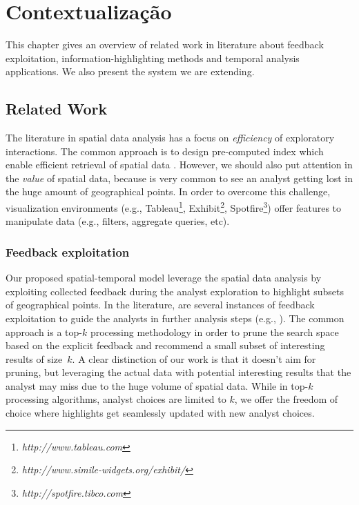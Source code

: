 \chapter{Contextualização}
\label{chap:contextualizacao}

This chapter gives an overview of related work in literature about feedback exploitation, information-highlighting methods and temporal analysis applications. We also present the system we are extending.

\section{Related Work}

The literature in spatial data analysis has a focus on {\em efficiency} of exploratory interactions. The common approach is to design pre-computed index which enable efficient retrieval of spatial data \cite{lins2013nanocubes}. However, we should also put attention in the {\em value} of spatial data, because is very common to see an analyst getting lost in the huge amount of geographical points. In order to overcome this challenge, visualization environments (e.g., Tableau\footnote{\it http://www.tableau.com}, Exhibit\footnote{\it http://www.simile-widgets.org/exhibit/}, Spotfire\footnote{\it  http://spotfire.tibco.com}) offer features to manipulate data (e.g., filters, aggregate queries, etc).

\subsection{Feedback exploitation}

Our proposed spatial-temporal model leverage the spatial data analysis by exploiting collected feedback during the analyst exploration to highlight subsets of geographical points. In the literature, are several instances of feedback exploitation to guide the analysts in further analysis steps (e.g., ).  The common approach is a top-$k$ processing methodology in order to prune the search space based on the explicit feedback and recommend a small subset of interesting results of size~$k$. A clear distinction of our work is that it doesn't aim for pruning, but leveraging the actual data with potential interesting results that the analyst may miss due to the huge volume of spatial data. While in top-$k$ processing algorithms, analyst choices are limited to $k$, we offer the freedom of choice where highlights get seamlessly updated with new analyst choices.

